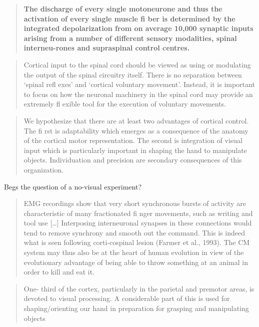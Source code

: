 \begin{quote}
\textbf{The discharge of every single motoneurone and thus the
activation of every single muscle fi ber is determined by the integrated
depolarization from on average 10,000 synaptic inputs arising from a
number of different sensory modalities, spinal interneu-rones and
supraspinal control centres.}
\end{quote}

\begin{quote}
Cortical input to the spinal cord should be viewed as using or
modulating the output of the spinal circuitry itself. There is no
separation between `spinal refl exes' and `cortical voluntary movement'.
Instead, it is important to focus on how the neuronal machinery in the
spinal cord may provide an extremely fl exible tool for the execution of
voluntary movements.
\end{quote}

\begin{quote}
We hypothesize that there are at least two advantages of cortical
control. The fi rst is adaptability which emerges as a consequence of
the anatomy of the cortical motor representation. The second is
integration of visual input which is particularly important in shaping
the hand to manipulate objects. Individuation and precision are
secondary consequences of this organization.
\end{quote}

Begs the question of a no-visual experiment?

\begin{quote}
EMG recordings show that very short synchronous bursts of activity are
characteristic of many fractionated fi nger movements, such as writing
and tool use {[}\ldots{]} Interposing interneuronal synapses in these
connections would tend to remove synchrony and smooth out the command.
This is indeed what is seen following corti-cospinal lesion (Farmer et
al., 1993). The CM system may thus also be at the heart of human
evolution in view of the evolutionary advantage of being able to throw
something at an animal in order to kill and eat it.
\end{quote}

\begin{quote}
One- third of the cortex, particularly in the parietal and premotor
areas, is devoted to visual processing. A considerable part of this is
used for shaping/orienting our hand in preparation for grasping and
manipulating objects
\end{quote}

